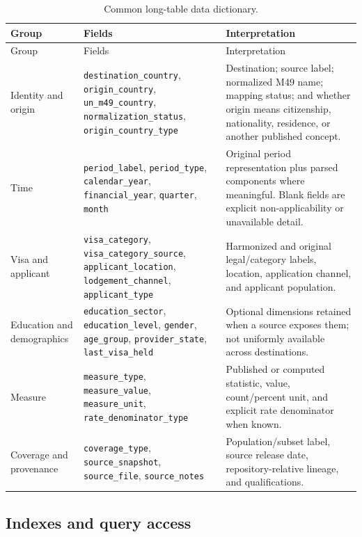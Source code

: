 \documentclass[runningheads]{llncs}
\begin{document}
\begin{longtable}{@{}L{2.4cm}L{4.1cm}L{5.3cm}@{}}
\caption{Common long-table data dictionary.}\label{tab:schema}\\
\toprule
Group & Fields & Interpretation \\
\midrule
\endfirsthead
\toprule
Group & Fields & Interpretation \\
\midrule
\endhead
Identity and origin & \texttt{destination\_country}, \texttt{origin\_country}, \texttt{un\_m49\_country}, \texttt{normalization\_status}, \texttt{origin\_country\_type} & Destination; source label; normalized M49 name; mapping status; and whether origin means citizenship, nationality, residence, or another published concept. \\
Time & \texttt{period\_label}, \texttt{period\_type}, \texttt{calendar\_year}, \texttt{financial\_year}, \texttt{quarter}, \texttt{month} & Original period representation plus parsed components where meaningful. Blank fields are explicit non-applicability or unavailable detail. \\
Visa and applicant & \texttt{visa\_category}, \texttt{visa\_category\_source}, \texttt{applicant\_location}, \texttt{lodgement\_channel}, \texttt{applicant\_type} & Harmonized and original legal/category labels, location, application channel, and applicant population. \\
Education and demographics & \texttt{education\_sector}, \texttt{education\_level}, \texttt{gender}, \texttt{age\_group}, \texttt{provider\_state}, \texttt{last\_visa\_held} & Optional dimensions retained when a source exposes them; not uniformly available across destinations. \\
Measure & \texttt{measure\_type}, \texttt{measure\_value}, \texttt{measure\_unit}, \texttt{rate\_denominator\_type} & Published or computed statistic, value, count/percent unit, and explicit rate denominator when known. \\
Coverage and provenance & \texttt{coverage\_type}, \texttt{source\_snapshot}, \texttt{source\_file}, \texttt{source\_notes} & Population/subset label, source release date, repository-relative lineage, and qualifications. \\
\bottomrule
\end{longtable}

\subsection{Indexes and query access}
\end{document}

